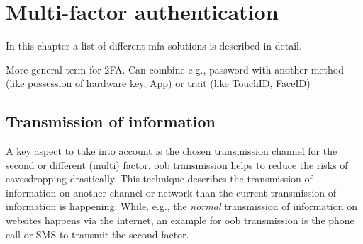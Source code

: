 \chapter{Multi-factor authentication}

In this chapter a list of different \gls{mfa} solutions is described in detail.
\cite{9781849287333}

More general term for 2FA. Can combine e.g., password with another method (like possession of hardware key, App) or trait (like TouchID, FaceID)

\section{Transmission of information}

A key aspect to take into account is the chosen transmission channel for the second or different (multi) factor. \gls{oob} transmission helps to reduce the risks of eavesdropping drastically. This technique describes the transmission of information on another channel or network than the current transmission of information is happening. While, e.g., the \textit{normal} transmission of information on websites happens via the internet, an  example for \gls{oob} transmission is the phone call or SMS to transmit the second factor.